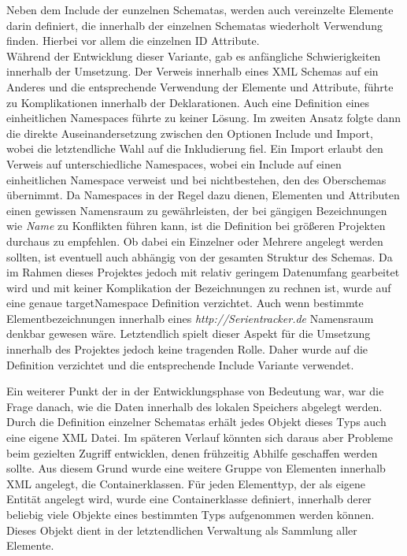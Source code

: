 Neben dem Include der eunzelnen Schematas, werden auch vereinzelte Elemente darin definiert, die innerhalb der einzelnen Schematas wiederholt Verwendung finden. Hierbei vor allem die einzelnen ID Attribute. \\

Während der Entwicklung dieser Variante, gab es anfängliche Schwierigkeiten innerhalb der Umsetzung. Der Verweis innerhalb eines XML Schemas auf ein Anderes und die entsprechende Verwendung der Elemente und Attribute, führte zu Komplikationen innerhalb der Deklarationen. Auch eine Definition eines einheitlichen Namespaces führte zu keiner Lösung. Im zweiten Ansatz folgte dann die direkte Auseinandersetzung zwischen den Optionen Include und Import, wobei die letztendliche Wahl auf die Inkludierung fiel. Ein Import erlaubt den Verweis auf unterschiedliche Namespaces, wobei ein Include auf einen einheitlichen Namespace verweist und bei nichtbestehen, den des Oberschemas übernimmt.
Da Namespaces in der Regel dazu dienen, Elementen und Attributen einen gewissen Namensraum zu gewährleisten, der bei gängigen Bezeichnungen wie \textit{Name} zu Konflikten führen kann, ist die Definition bei größeren Projekten durchaus zu empfehlen. Ob dabei ein Einzelner oder Mehrere angelegt werden sollten, ist eventuell auch abhängig von der gesamten Struktur des Schemas. Da im Rahmen dieses Projektes jedoch mit relativ geringem Datenumfang gearbeitet wird und mit keiner Komplikation der Bezeichnungen zu rechnen ist, wurde auf eine genaue targetNamespace Definition verzichtet. Auch wenn bestimmte Elementbezeichnungen innerhalb eines \textit{http://Serientracker.de} Namensraum denkbar gewesen wäre. Letztendlich spielt dieser Aspekt für die Umsetzung innerhalb des Projektes jedoch keine tragenden Rolle. Daher wurde auf die Definition verzichtet und die entsprechende Include Variante verwendet.


Ein weiterer Punkt der in der Entwicklungsphase von Bedeutung war, war die Frage danach, wie die Daten innerhalb des lokalen Speichers abgelegt werden.
Durch die Definition einzelner Schematas erhält jedes Objekt dieses Typs auch eine eigene XML Datei. Im späteren Verlauf könnten sich daraus aber Probleme beim gezielten Zugriff entwicklen, denen frühzeitig Abhilfe geschaffen werden sollte.
Aus diesem Grund wurde eine weitere Gruppe von Elementen innerhalb XML angelegt, die Containerklassen.
Für jeden Elementtyp, der als eigene Entität angelegt wird, wurde eine Containerklasse definiert, innerhalb derer beliebig viele Objekte eines bestimmten Typs aufgenommen werden können. Dieses Objekt dient in der letztendlichen Verwaltung als Sammlung aller Elemente.

